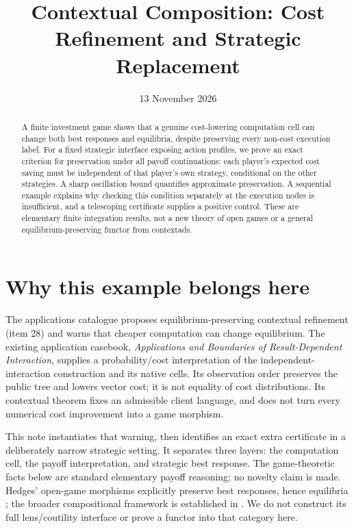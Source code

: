 \documentclass[11pt]{article}
\title{Contextual Composition: Cost Refinement and Strategic Replacement}
\author{}
\date{13 November 2026}
\begin{document}
\maketitle
\begin{abstract}
A finite investment game shows that a genuine cost-lowering computation cell can change both best responses and equilibria, despite preserving every non-cost execution label. For a fixed strategic interface exposing action profiles, we prove an exact criterion for preservation under all payoff continuations: each player's expected cost saving must be independent of that player's own strategy, conditional on the other strategies. A sharp oscillation bound quantifies approximate preservation. A sequential example explains why checking this condition separately at the execution nodes is insufficient, and a telescoping certificate supplies a positive control. These are elementary finite integration results, not a new theory of open games or a general equilibrium-preserving functor from contextads.
\end{abstract}

\section{Why this example belongs here}
The applications catalogue proposes equilibrium-preserving contextual refinement (item 28) and warns that cheaper computation can change equilibrium. The existing application casebook, \emph{Applications and Boundaries of Result-Dependent Interaction}, supplies a probability/cost interpretation of the independent-interaction construction and its native cells. Its observation order preserves the public tree and lowers vector cost; it is not equality of cost distributions. Its contextual theorem fixes an admissible client language, and does not turn every numerical cost improvement into a game morphism.

This note instantiates that warning, then identifies an exact extra certificate in a deliberately narrow strategic setting. It separates three layers: the computation cell, the payoff interpretation, and strategic best response. The game-theoretic facts below are standard elementary payoff reasoning; no novelty claim is made. Hedges' open-game morphisms explicitly preserve best responses, hence equilibria \cite{hedges}; the broader compositional framework is established in \cite{ghani}. We do not construct its full lens/coutility interface or prove a functor into that category here.
\end{document}
